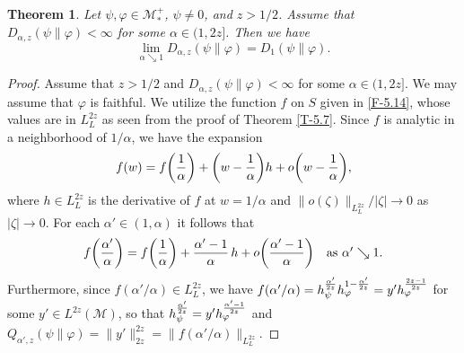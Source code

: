 \documentclass[12pt]{article}
\newtheorem{theorem}{Theorem}[section]
\theoremstyle{definition}
\theoremstyle{remark}
\numberwithin{equation}{section}
\def\Me{\mathcal M}
\def\ffi{\varphi}
\begin{document}
\begin{theorem}\label{T-6.9}
Let $\psi,\ffi\in\Me_*^+$, $\psi\ne0$, and $z>1/2$. Assume that $D_{\alpha,z}(\psi\|\ffi)<\infty$ for some
$\alpha\in(1,2z]$. Then we have
\[
\lim_{\alpha\searrow1}D_{\alpha,z}(\psi\|\ffi)=D_1(\psi\|\ffi).
\]
\end{theorem}

\begin{proof}
Assume that $z>1/2$ and $D_{\alpha,z}(\psi\|\ffi)<\infty$ for some $\alpha\in(1,2z]$. We may assume that
$\ffi$ is faithful. We utilize the function $f$ on $S$ given in \eqref{F-5.14}, whose values are in $L^{2z}_L$
as seen from the proof of Theorem \ref{T-5.7}. Since $f$ is analytic in a neighborhood of $1/\alpha$, we have
the expansion
\[
f(w)=f\biggl({1\over\alpha}\biggr)+\biggl(w-{1\over\alpha}\biggr)h+o\biggl(w-{1\over\alpha}\biggr),
\]
where $h\in L^{2z}_L$ is the derivative of $f$ at $w=1/\alpha$ and $\|o(\zeta)\|_{L^{2z}_L}/|\zeta|\to0$ as
$|\zeta|\to0$. For each $\alpha'\in(1,\alpha)$ it follows that
\[
f\biggl({\alpha'\over\alpha}\biggr)=f\biggl({1\over\alpha}\biggr)+{\alpha'-1\over\alpha}\,h
+o\biggl({\alpha'-1\over\alpha}\biggr)\quad\mbox{as $\alpha'\searrow1$}.
\]
Furthermore,  since $f(\alpha'/\alpha)\in L^{2z}_L$, we have
$f(\alpha'/\alpha)=h_\psi^{\alpha'\over2z}h_\ffi^{1-{\alpha'\over2z}}=y'h_\ffi^{2z-1\over2z}$ for some
$y'\in L^{2z}(\Me)$, so that $h_\psi^{\alpha'\over 2z}=y'h_\ffi^{\alpha'-1\over 2z}$ and 
$Q_{\alpha',z}(\psi\|\ffi)=\|y'\|_{2z}^{2z}=\|f(\alpha'/\alpha)\|_{L^{2z}_L}$.


\end{proof}
\end{document}
